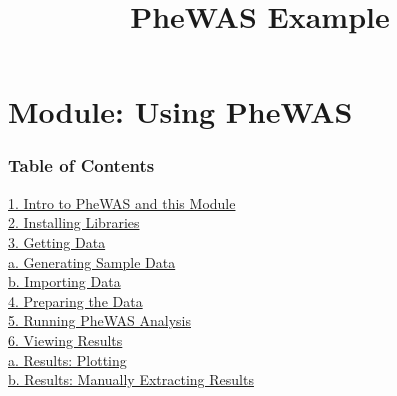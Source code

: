 \documentclass{article}
\title{PheWAS Example}
\begin{document}
    
    
    \maketitle
    
    

    
    \section{Module: Using PheWAS}\label{module-using-phewas}

    \subsubsection{Table of Contents}\label{table-of-contents}

\protect\hyperlink{1.-Intro-to-PheWAS-and-this-Module}{1. Intro to
PheWAS and this Module}\\
\protect\hyperlink{2.-Installing-Libraries}{2. Installing Libraries}\\
\protect\hyperlink{3.-Getting-Data}{3. Getting Data}\\
\hspace*{0.333em}\hspace*{0.333em}\hspace*{0.333em}\hspace*{0.333em}\protect\hyperlink{3a.-Generating-Sample-Data}{a.
Generating Sample Data}\\
\hspace*{0.333em}\hspace*{0.333em}\hspace*{0.333em}\hspace*{0.333em}\protect\hyperlink{3b.-Importing-Data}{b.
Importing Data}\\
\protect\hyperlink{4.-Preparing-the-Data}{4. Preparing the Data}\\
\protect\hyperlink{5.-Running-PheWAS-Analysis}{5. Running PheWAS
Analysis}\\
\protect\hyperlink{6.-Viewing-Results}{6. Viewing Results}\\
\hspace*{0.333em}\hspace*{0.333em}\hspace*{0.333em}\hspace*{0.333em}\protect\hyperlink{6a.-Results:-Plotting}{a.
Results: Plotting}\\
\hspace*{0.333em}\hspace*{0.333em}\hspace*{0.333em}\hspace*{0.333em}\protect\hyperlink{6b.-Results:-Manually-Extracting-Results}{b.
Results: Manually Extracting Results}\\
\end{document}
